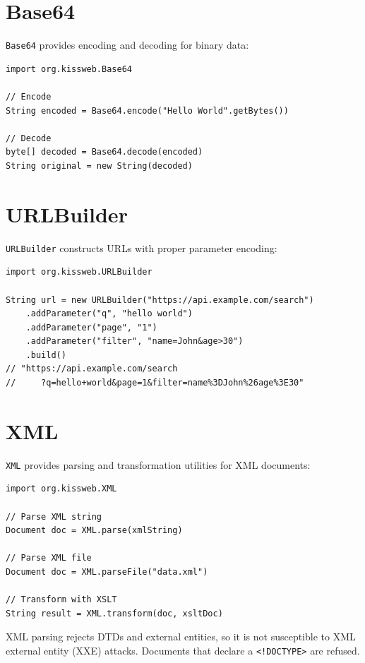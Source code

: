 \section{Base64}
\label{sec:util-base64}

\texttt{Base64} provides encoding and decoding for binary data:

\begin{lstlisting}[style=groovy]
import org.kissweb.Base64

// Encode
String encoded = Base64.encode("Hello World".getBytes())

// Decode
byte[] decoded = Base64.decode(encoded)
String original = new String(decoded)
\end{lstlisting}

\section{URLBuilder}
\label{sec:util-urlbuilder}

\texttt{URLBuilder} constructs URLs with proper parameter encoding:

\begin{lstlisting}[style=groovy]
import org.kissweb.URLBuilder

String url = new URLBuilder("https://api.example.com/search")
    .addParameter("q", "hello world")
    .addParameter("page", "1")
    .addParameter("filter", "name=John&age>30")
    .build()
// "https://api.example.com/search
//     ?q=hello+world&page=1&filter=name%3DJohn%26age%3E30"
\end{lstlisting}

\section{XML}
\label{sec:util-xml}

\texttt{XML} provides parsing and transformation utilities for XML documents:

\begin{lstlisting}[style=groovy]
import org.kissweb.XML

// Parse XML string
Document doc = XML.parse(xmlString)

// Parse XML file
Document doc = XML.parseFile("data.xml")

// Transform with XSLT
String result = XML.transform(doc, xsltDoc)
\end{lstlisting}

\begin{notebox}
XML parsing rejects DTDs and external entities, so it is not susceptible to XML external entity (XXE) attacks.  Documents that declare a \texttt{<!DOCTYPE>} are refused.
\end{notebox}

